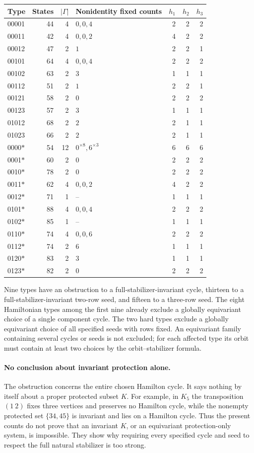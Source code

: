 \documentclass[11pt]{article}
\begin{document}
\begin{center}\small
\begin{tabular}{lrrlrrr}
\toprule
Type & States & $|\Gamma|$ & Nonidentity fixed counts & $h_1$ & $h_2$ & $h_3$\\
\midrule
00001&44&4&$0,0,4$&2&2&2\\
00011&42&4&$0,0,2$&4&2&2\\
00012&47&2&$1$&2&2&1\\
00101&64&4&$0,0,4$&2&2&2\\
00102&63&2&$3$&1&1&1\\
00112&51&2&$1$&2&2&1\\
00121&58&2&$0$&2&2&2\\
00123&57&2&$3$&1&1&1\\
01012&68&2&$2$&2&1&1\\
01023&66&2&$2$&2&1&1\\
0000$\ast$&54&12&$0^{\times8},6^{\times3}$&6&6&6\\
0001$\ast$&60&2&$0$&2&2&2\\
0010$\ast$&78&2&$0$&2&2&2\\
0011$\ast$&62&4&$0,0,2$&4&2&2\\
0012$\ast$&71&1&--&1&1&1\\
0101$\ast$&88&4&$0,0,4$&2&2&2\\
0102$\ast$&85&1&--&1&1&1\\
0110$\ast$&74&4&$0,0,6$&2&2&2\\
0112$\ast$&74&2&$6$&1&1&1\\
0120$\ast$&83&2&$3$&1&1&1\\
0123$\ast$&82&2&$0$&2&2&2\\
\bottomrule
\end{tabular}
\end{center}

Nine types have an obstruction to a full-stabilizer-invariant cycle,
thirteen to a full-stabilizer-invariant two-row seed, and fifteen to a
three-row seed. The eight Hamiltonian types among the first nine already
exclude a globally equivariant choice of a single component cycle.
The two hard types exclude a globally equivariant choice of all specified
seeds with rows fixed. An equivariant family containing several cycles
or seeds is not excluded; for each affected type its orbit must contain
at least two choices by the orbit--stabilizer formula.

\paragraph{No conclusion about invariant protection alone.}
The obstruction concerns the entire chosen Hamilton cycle. It says
nothing by itself about a proper protected subset $K$. For example,
in $K_5$ the transposition $(1\ 2)$ fixes three vertices and preserves
no Hamilton cycle, while the nonempty protected set $\{34,45\}$ is
invariant and lies on a Hamilton cycle. Thus the present counts do not
prove that an invariant $K$, or an equivariant protection-only system,
is impossible. They show why requiring every specified cycle and seed
to respect the full natural stabilizer is too strong.
\end{document}
